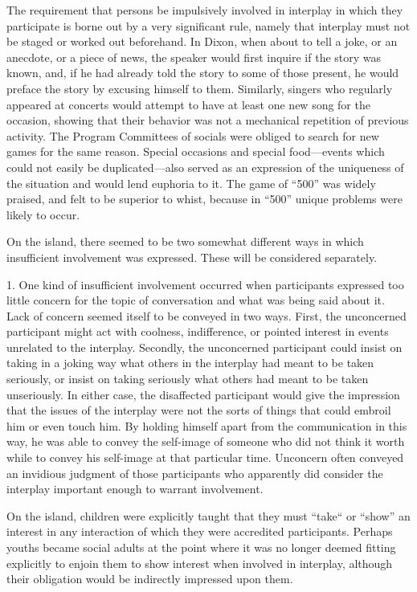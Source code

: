 \documentclass[twoside,symmetric,nobib,justified]{tufte-book}
\begin{document}
The requirement that persons be impulsively involved in interplay in
which they participate is borne out by a very significant rule, namely
that interplay must not be staged or worked out beforehand. In Dixon,
when about to tell a joke, or an anecdote, or a piece of news, the
speaker would first inquire if the story was known, and, if he had
already told the story to some of those present, he would preface the
story by excusing himself to them. Similarly, singers who regularly
appeared at concerts would attempt to have at least one new song for the
occasion, showing that their behavior was not a mechanical repetition of
previous activity. The Program Committees of socials were obliged to
search for new games for the same reason. Special occasions and special
food---events which could not easily be duplicated---also served as an
expression of the uniqueness of the situation and would lend euphoria to
it. The game of ``500'' was widely praised, and felt to be superior to
whist, because in ``500'' unique problems were likely to occur.

On the island, there seemed to be two somewhat different ways in which
insufficient involvement was expressed. These will be considered
separately.

1. One kind of insufficient involvement occurred when participants
expressed too little concern for the topic of conversation and what was
being said about it. Lack of concern seemed itself to be conveyed in two
ways. First, the unconcerned participant might act with coolness,
indifference, or pointed interest in events unrelated to the interplay.
Secondly, the unconcerned participant could insist on taking in a joking
way what others in the interplay had meant to be taken seriously, or
insist on taking seriously what others had meant to be taken
unseriously. In either case, the disaffected participant would give the
impression that the issues of the interplay were not the sorts of things
that could embroil him or even touch him. By holding himself apart from
the communication in this way, he was able to convey the self-image of
someone who did not think it worth while to convey his self-image at
that particular time. Unconcern often conveyed an invidious judgment of
those participants who apparently did consider the interplay important
enough to warrant involvement.

On the island, children were explicitly taught that they must ``take``
or ``show'' an interest in any interaction of which they were accredited
participants. Perhaps youths became social adults at the point where it
was no longer deemed fitting explicitly to enjoin them to show interest
when involved in interplay, although their obligation would be
indirectly impressed upon them.
\end{document}
